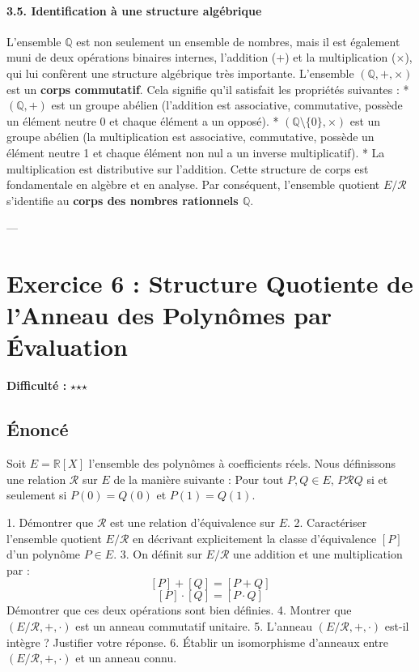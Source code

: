 \documentclass{report}
\begin{document}
\subsubsection*{3.5. Identification à une structure algébrique}
L'ensemble $\mathbb{Q}$ est non seulement un ensemble de nombres, mais il est également muni de deux opérations binaires internes, l'addition (+) et la multiplication ($\times$), qui lui confèrent une structure algébrique très importante.
L'ensemble $(\mathbb{Q}, +, \times)$ est un \textbf{corps commutatif}. Cela signifie qu'il satisfait les propriétés suivantes :
*   $(\mathbb{Q}, +)$ est un groupe abélien (l'addition est associative, commutative, possède un élément neutre 0 et chaque élément a un opposé).
*   $(\mathbb{Q} \setminus \{0\}, \times)$ est un groupe abélien (la multiplication est associative, commutative, possède un élément neutre 1 et chaque élément non nul a un inverse multiplicatif).
*   La multiplication est distributive sur l'addition.
Cette structure de corps est fondamentale en algèbre et en analyse.
Par conséquent, l'ensemble quotient $E/\mathcal{R}$ s'identifie au \textbf{corps des nombres rationnels $\mathbb{Q}$}.
\newpage

\newpage
---

\chapter*{Exercice 6 : Structure Quotiente de l'Anneau des Polynômes par Évaluation}
\textbf{Difficulté :} $\star$$\star$$\star$

\section*{Énoncé}

Soit $E = \mathbb{R}[X]$ l'ensemble des polynômes à coefficients réels.
Nous définissons une relation $\mathcal{R}$ sur $E$ de la manière suivante :
Pour tout $P, Q \in E$, $P \mathcal{R} Q$ si et seulement si $P(0) = Q(0)$ et $P(1) = Q(1)$.

1.  Démontrer que $\mathcal{R}$ est une relation d'équivalence sur $E$.
2.  Caractériser l'ensemble quotient $E/\mathcal{R}$ en décrivant explicitement la classe d'équivalence $[P]$ d'un polynôme $P \in E$.
3.  On définit sur $E/\mathcal{R}$ une addition et une multiplication par :
    $$[P] + [Q] = [P+Q]$$
    $$[P] \cdot [Q] = [P \cdot Q]$$
    Démontrer que ces deux opérations sont bien définies.
4.  Montrer que $(E/\mathcal{R}, +, \cdot)$ est un anneau commutatif unitaire.
5.  L'anneau $(E/\mathcal{R}, +, \cdot)$ est-il intègre ? Justifier votre réponse.
6.  Établir un isomorphisme d'anneaux entre $(E/\mathcal{R}, +, \cdot)$ et un anneau connu.
\end{document}
